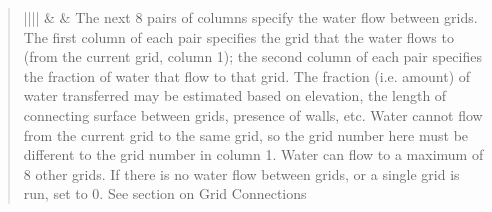 \documentclass[letterpaper,10pt,english]{sphinxmanual}
\begin{document}
\begin{fulllineitems}
\begin{quote}
\begin{description}
\begin{savenotes}
\begin{longtable}{||||}
{\hyperref[\detokenize{input_files/SUEWS_SiteInfo/SUEWS_SiteSelect:suews-siteselect-txt}]{}}
&
{\hyperref[\detokenize{notation:term-md}]{}} {\hyperref[\detokenize{notation:term-mu}]{}}
&
The next 8 pairs of columns specify the water flow between grids. The first column of each pair specifies the grid that the water flows to (from the current grid, column 1); the second column of each pair specifies the fraction of water that flow to that grid. The fraction (i.e. amount) of water transferred may be estimated based on elevation, the length of connecting surface between grids, presence of walls, etc. Water cannot flow from the current grid to the same grid, so the grid number here must be different to the grid number in column 1. Water can flow to a maximum of 8 other grids. If there is no water flow between grids, or a single grid is run, set to 0. See section on Grid Connections
\\
\hline
\end{longtable}\sphinxatlongtableend\end{savenotes}

\end{description}\end{quote}

\end{fulllineitems}

\end{document}
